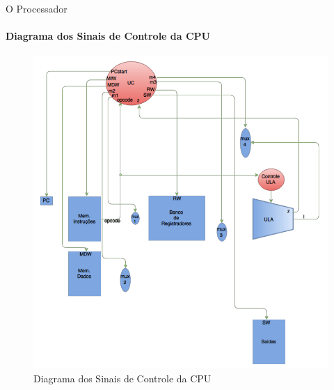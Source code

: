 \documentclass[aspectratio=169]{beamer}
\begin{document}
\begin{frame}{O Processador}
{		}
		\only<3>
		{
			\framesubtitle{Diagrama dos Sinais de Controle da CPU}
			
			\begin{figure}
				\includegraphics[height=0.8\textheight]{figuras/Diagrama_dos_sianais_de_comtrole_da_cpu}
				\caption{Diagrama dos Sinais de Controle da CPU}
			\end{figure}
			
		}
		
		
		
	\end{frame}
	
\end{document}
